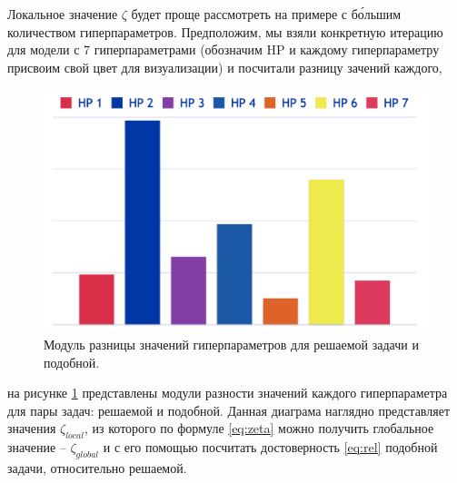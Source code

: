 \documentclass[times,specification,annotation]{itmo-student-thesis}
\begin{document}
	Локальное значение $ \zeta $ будет проще рассмотреть на примере с б\'ольшим количеством гиперпараметров. Предположим, мы взяли конкретную итерацию для модели с 7 гиперпараметрами (обозначим HP и каждому гиперпараметру присвоим свой цвет для визуализации) и посчитали разницу зачений каждого, 
	\begin{figure}[!ht]
		\caption{Модуль разницы значений гиперпараметров для решаемой задачи и подобной.}\label{img:hp-difference}
		\includegraphics[width=0.85\linewidth]{hp-difference}
		\centering
	\end{figure}
	на рисунке \ref{img:hp-difference} представлены модули разности значений каждого гиперпараметра для пары задач: решаемой и подобной. Данная диаграма наглядно представляет значения $ \zeta_{local} $, из которого по формуле \ref{eq:zeta} можно получить глобальное значение -- $ \zeta_{global} $ и с его помощью посчитать достоверность \ref{eq:rel} подобной задачи, относительно решаемой. \par 
	
\end{document}
